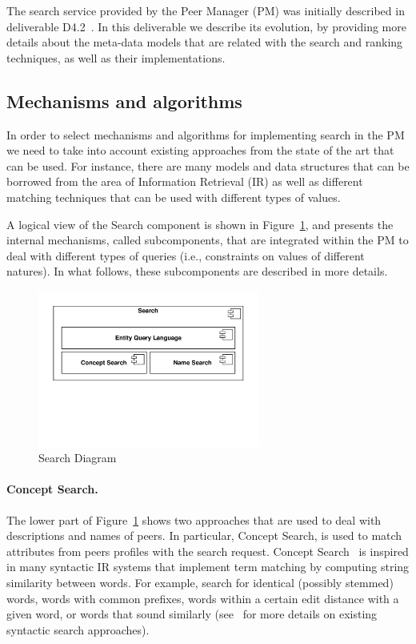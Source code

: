 
The search service provided by the Peer Manager (PM) was initially described in deliverable D4.2~\cite{D4.2}. In this deliverable we describe its evolution, by providing more details about the meta-data models that are related with the search and ranking techniques, as well as their implementations.

\subsection{Mechanisms and algorithms}

In order to select mechanisms and algorithms for implementing search in the PM we need to take into account existing approaches from the state of the art that can be used. For instance, there are many models and data structures that can be borrowed from the area of Information Retrieval (IR) as well as different matching techniques that can be used with different types of values. 

A logical view of the Search component is shown in Figure~\ref{fig:search_diagram}, and presents the internal mechanisms, called subcomponents, that are integrated within the PM to deal with different types of queries (i.e., constraints on values of different natures). 
In what follows, these subcomponents are described in more details.

\begin{figure}[htbp]
\centering
\includegraphics[width=0.65\textwidth]{figures/SearchComponentDiagram}
\caption{Search Diagram}
\label{fig:search_diagram}
\end{figure}

\paragraph{Concept Search.} 
\label{par:concept_search}
The lower part of Figure~\ref{fig:search_diagram} shows two approaches that are used to deal with descriptions and names of peers. In particular, Concept Search, is used to match attributes from peers profiles with the search request. Concept Search~\cite{Giunchiglia:2009fk} is inspired in many syntactic IR systems that implement term matching by computing string similarity between words. For example, search for identical (possibly stemmed) words, words with common prefixes, words within a certain edit distance with a given word, or words that sound similarly (see~\cite{Manning:2008:IIR:1394399} for more details on existing syntactic search approaches). 

